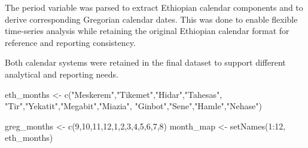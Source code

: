 \documentclass[
  letterpaper,
  DIV=11,
  numbers=noendperiod]{scrartcl}
\newenvironment{Shaded}{\begin{snugshade}}{\end{snugshade}}
\newcommand{\DecValTok}[1]{\textcolor[rgb]{0.68,0.00,0.00}{#1}}
\newcommand{\FunctionTok}[1]{\textcolor[rgb]{0.28,0.35,0.67}{#1}}
\newcommand{\NormalTok}[1]{\textcolor[rgb]{0.00,0.23,0.31}{#1}}
\newcommand{\OtherTok}[1]{\textcolor[rgb]{0.00,0.23,0.31}{#1}}
\newcommand{\SpecialCharTok}[1]{\textcolor[rgb]{0.37,0.37,0.37}{#1}}
\newcommand{\StringTok}[1]{\textcolor[rgb]{0.13,0.47,0.30}{#1}}
\begin{document}
The period variable was parsed to extract Ethiopian calendar components
and to derive corresponding Gregorian calendar dates. This was done to
enable flexible time-series analysis while retaining the original
Ethiopian calendar format for reference and reporting consistency.

Both calendar systems were retained in the final dataset to support
different analytical and reporting needs.

\begin{Shaded}
\begin{Highlighting}[]
\NormalTok{eth\_months }\OtherTok{\textless{}{-}} \FunctionTok{c}\NormalTok{(}\StringTok{"Meskerem"}\NormalTok{,}\StringTok{"Tikemet"}\NormalTok{,}\StringTok{"Hidar"}\NormalTok{,}\StringTok{"Tahesas"}\NormalTok{,}
                \StringTok{"Tir"}\NormalTok{,}\StringTok{"Yekatit"}\NormalTok{,}\StringTok{"Megabit"}\NormalTok{,}\StringTok{"Miazia"}\NormalTok{,}
                \StringTok{"Ginbot"}\NormalTok{,}\StringTok{"Sene"}\NormalTok{,}\StringTok{"Hamle"}\NormalTok{,}\StringTok{"Nehase"}\NormalTok{)}

\NormalTok{greg\_months }\OtherTok{\textless{}{-}} \FunctionTok{c}\NormalTok{(}\DecValTok{9}\NormalTok{,}\DecValTok{10}\NormalTok{,}\DecValTok{11}\NormalTok{,}\DecValTok{12}\NormalTok{,}\DecValTok{1}\NormalTok{,}\DecValTok{2}\NormalTok{,}\DecValTok{3}\NormalTok{,}\DecValTok{4}\NormalTok{,}\DecValTok{5}\NormalTok{,}\DecValTok{6}\NormalTok{,}\DecValTok{7}\NormalTok{,}\DecValTok{8}\NormalTok{)}
\NormalTok{month\_map }\OtherTok{\textless{}{-}} \FunctionTok{setNames}\NormalTok{(}\DecValTok{1}\SpecialCharTok{:}\DecValTok{12}\NormalTok{, eth\_months)}


\end{Highlighting}
\end{Shaded}
\end{document}
